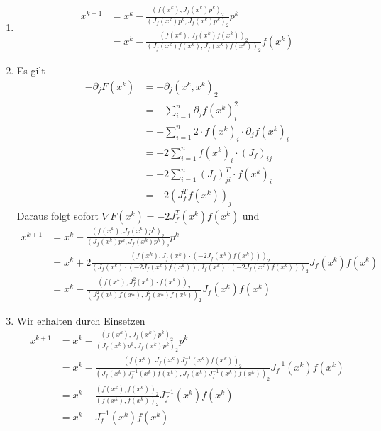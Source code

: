 \documentclass{article}
\theoremstyle{definition}
\begin{document}
\begin{enumerate}
    \item \begin{align*}
        x^{k+1} &= x^k -\frac{(f(x^k),J_f(x^k)p^k)_2}{(J_f(x^k)p^k,J_f(x^k)p^k)_2}p^k\\
        &= x^k - \frac{(f(x^k),J_f(x^k)f(x^k))_2}{(J_f(x^k)f(x^k),J_f(x^k)f(x^k))_2}f(x^k)
    \end{align*}
    \item Es gilt 
    \begin{align*}
        -\partial_j F(x^k) &= -\partial_j (x^k, x^k)_2\\
        &= -\sum_{i = 1}^{n} \partial_j f(x^k)_i^2\\
        &= -\sum_{i = 1}^{n} 2 \cdot f(x^k)_i \cdot \partial_j f(x^k)_i\\
        &= -2 \sum_{i = 1}^{n} f(x^k)_i\cdot (J_f)_{ij}\\
        &= -2 \sum_{i = 1}^{n} (J_f)^T_{ji}\cdot f(x^k)_i\\
        &= -2 (J_f^Tf(x^k))_j
    \end{align*}
    Daraus folgt sofort $\nabla F(x^k) = -2 J_f^T(x^k)f(x^k)$ und
    \begin{align*}
        x^{k+1} &= x^k -\frac{(f(x^k),J_f(x^k)p^k)_2}{(J_f(x^k)p^k,J_f(x^k)p^k)_2}p^k\\
        &= x^k +2 \frac{(f(x^k),J_f(x^k)\cdot (-2J_f(x^k)f(x^k)))_2}{(J_f(x^k)\cdot (-2J_f(x^k)f(x^k)),J_f(x^k)\cdot (-2J_f(x^k)f(x^k)))_2}J_f(x^k)f(x^k)\\
        &= x^k -\frac{(f(x^k),J_f^2(x^k)\cdot f(x^k))_2}{(J_f^2(x^k) f(x^k),J_f^2(x^k)f(x^k))_2}J_f(x^k)f(x^k)
    \end{align*}
    \item Wir erhalten durch Einsetzen
    \begin{align*}
        x^{k+1} &= x^k -\frac{(f(x^k),J_f(x^k)p^k)_2}{(J_f(x^k)p^k,J_f(x^k)p^k)_2}p^k\\
        &= x^k -\frac{(f(x^k),J_f(x^k)J_f^{-1}(x^k)f(x^k))_2}{(J_f(x^k)J_f^{-1}(x^k)f(x^k),J_f(x^k)J_f^{-1}(x^k)f(x^k))_2}J_f^{-1}(x^k)f(x^k)\\
        &= x^k - \frac{(f(x^k),f(x^k))_2}{(f(x^k),f(x^k))_2}J_f^{-1}(x^k)f(x^k)\\
        &= x^k - J_f^{-1}(x^k)f(x^k)
    \end{align*}
\end{enumerate}
\end{document}
